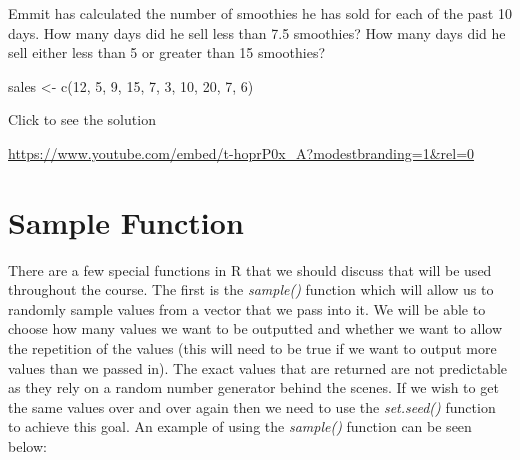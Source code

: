\documentclass[
  letterpaper,
  DIV=11,
  numbers=noendperiod]{scrreprt}
\newenvironment{Shaded}{\begin{snugshade}}{\end{snugshade}}
\newcommand{\DecValTok}[1]{\textcolor[rgb]{0.68,0.00,0.00}{#1}}
\newcommand{\FunctionTok}[1]{\textcolor[rgb]{0.28,0.35,0.67}{#1}}
\newcommand{\NormalTok}[1]{\textcolor[rgb]{0.00,0.23,0.31}{#1}}
\newcommand{\OtherTok}[1]{\textcolor[rgb]{0.00,0.23,0.31}{#1}}
\begin{document}
\begin{tcolorbox}[enhanced jigsaw, colframe=quarto-callout-tip-color-frame, colback=white, breakable, rightrule=.15mm, title=\textcolor{quarto-callout-tip-color}{\faLightbulb}\hspace{0.5em}{Try it Out}, bottomtitle=1mm, toptitle=1mm, titlerule=0mm, left=2mm, coltitle=black, colbacktitle=quarto-callout-tip-color!10!white, leftrule=.75mm, opacitybacktitle=0.6, bottomrule=.15mm, opacityback=0, arc=.35mm, toprule=.15mm]

Emmit has calculated the number of smoothies he has sold for each of the
past 10 days. How many days did he sell less than 7.5 smoothies? How
many days did he sell either less than 5 or greater than 15 smoothies?

\begin{Shaded}
\begin{Highlighting}[]
\NormalTok{sales }\OtherTok{\textless{}{-}} \FunctionTok{c}\NormalTok{(}\DecValTok{12}\NormalTok{, }\DecValTok{5}\NormalTok{, }\DecValTok{9}\NormalTok{, }\DecValTok{15}\NormalTok{, }\DecValTok{7}\NormalTok{, }\DecValTok{3}\NormalTok{, }\DecValTok{10}\NormalTok{, }\DecValTok{20}\NormalTok{, }\DecValTok{7}\NormalTok{, }\DecValTok{6}\NormalTok{)}
\end{Highlighting}
\end{Shaded}

Click to see the solution

\url{https://www.youtube.com/embed/t-hoprP0x_A?modestbranding=1&rel=0}

\end{tcolorbox}

\section{Sample Function}\label{sample-function}

There are a few special functions in R that we should discuss that will
be used throughout the course. The first is the \emph{sample()} function
which will allow us to randomly sample values from a vector that we pass
into it. We will be able to choose how many values we want to be
outputted and whether we want to allow the repetition of the values
(this will need to be true if we want to output more values than we
passed in). The exact values that are returned are not predictable as
they rely on a random number generator behind the scenes. If we wish to
get the same values over and over again then we need to use the
\emph{set.seed()} function to achieve this goal. An example of using the
\emph{sample()} function can be seen below:
\end{document}
